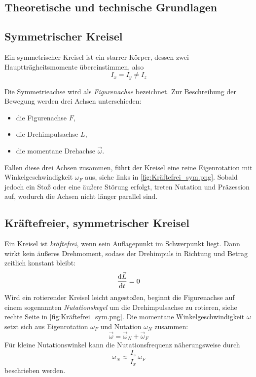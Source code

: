 \newpage

\subsection[Theoretische und technische Grundlagen]{Theoretische und technische Grundlagen \protect\autocite{Skript_2.1}}

\subsection{Symmetrischer Kreisel}\label{ssec:SymKrei}
Ein symmetrischer Kreisel ist ein starrer Körper, dessen zwei Hauptträgheitsmomente übereinstimmen, also
\[I_x = I_y \neq I_z\]

Die Symmetrieachse wird als \textit{Figurenachse} bezeichnet. Zur Beschreibung der Bewegung werden drei Achsen unterschieden:
\begin{itemize}
    \item die Figurenachse \(F\),
    \item die Drehimpulsachse \(L\),
    \item die momentane Drehachse \(\vec{\omega}\).
\end{itemize}
Fallen diese drei Achsen zusammen, führt der Kreisel eine reine Eigenrotation mit Winkelgeschwindigkeit \(\omega_F\) aus, siehe links in \cref{fig:Kräftefrei_sym.png}. Sobald jedoch ein Stoß oder eine äußere Störung erfolgt, treten Nutation und Präzession auf, wodurch die Achsen nicht länger parallel sind. 

\subsection{Kräftefreier, symmetrischer Kreisel}\label{ssec:NonFKrei}
Ein Kreisel ist \textit{kräftefrei}, wenn sein Auflagepunkt im Schwerpunkt liegt. Dann wirkt kein äußeres Drehmoment, sodass der Drehimpuls in Richtung und Betrag zeitlich konstant bleibt:
\[\frac{\mathop{}\!\mathrm{d}\vec{L}}{\mathop{}\!\mathrm{d} t} = 0\]
Wird ein rotierender Kreisel leicht angestoßen, beginnt die Figurenachse auf einem sogenannten \textit{Nutationskegel} um die Drehimpulsachse zu rotieren, siehe rechte Seite in \cref{fig:Kräftefrei_sym.png}. Die momentane Winkelgeschwindigkeit \(\omega\) setzt sich aus Eigenrotation \(\omega_F\) und Nutation \(\omega_N\) zusammen:
\begin{equation}
    \label{eq:omega_sum}
    \vec{\omega} = \vec{\omega}_N + \vec{\omega}_F
\end{equation}
Für kleine Nutationswinkel kann die Nutationsfrequenz näherungsweise durch
\begin{equation}
    \label{eq:nutation}
    \omega_N \approx \frac{I_z}{I_x}\,\omega_F
\end{equation}
beschrieben werden.

